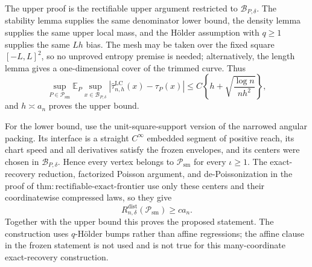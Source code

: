 The upper proof is the rectifiable upper argument restricted to \(\mathcal B_{P,\delta}\).  The stability lemma supplies the same denominator lower bound, the density lemma supplies the same upper local mass, and the H\"older assumption with \(q\geq1\) supplies the same \(Lh\) bias.  The mesh may be taken over the fixed square \([-L,L]^2\), so no unproved entropy premise is needed; alternatively, the length lemma gives a one-dimensional cover of the trimmed curve.  Thus
\[
 \sup_{P\in\mathcal P_{\mathrm{sm}}}\mathbb E_P\sup_{x\in\mathcal B_{P,\delta}}
 |\widehat\tau^{\mathrm{LC}}_{n,h}(x)-\tau_P(x)|
 \leq C\left\{h+\sqrt{\frac{\log n}{nh^2}}\right\},
\]
and \(h\asymp a_n\) proves the upper bound.

For the lower bound, use the unit-square-support version of the narrowed angular packing.  Its interface is a straight \(C^\infty\) embedded segment of positive reach, its chart speed and all derivatives satisfy the frozen envelopes, and its centers were chosen in \(\mathcal B_{P,\delta}\).  Hence every vertex belongs to \(\mathcal P_{\mathrm{sm}}\) for every \(\iota\geq1\).  The exact-recovery reduction, factorized Poisson argument, and de-Poissonization in the proof of \(\mathrm{thm:rectifiable\text{-}exact\text{-}frontier}\) use only these centers and their coordinatewise compressed laws, so they give
\[
 R_{n,\delta}^{\mathrm{dist}}(\mathcal P_{\mathrm{sm}})\geq c a_n.
\]
Together with the upper bound this proves the proposed statement.  The construction uses \(q\)-H\"older bumps rather than affine regressions; the affine clause in the frozen statement is not used and is not true for this many-coordinate exact-recovery construction.